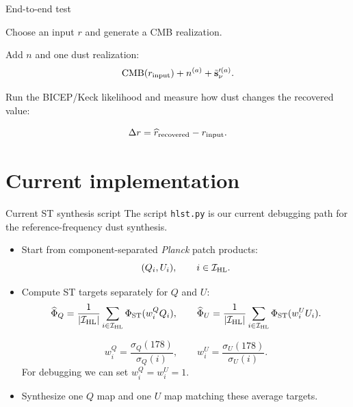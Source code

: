 \documentclass[aspectratio=169,11pt]{beamer}
\newcommand{\bk}{BICEP/Keck}
\newcommand{\Planck}{\textit{Planck}}
\newcommand{\st}{\mathrm{ST}}
\begin{document}
\begin{frame}{End-to-end test}
  \begin{center}
    \Large
    Choose an input $r$ and generate a CMB realization.

    \vspace{0.45cm}
    Add $n$ and one dust realization:
    \[
      {\rm CMB}(r_{\rm input}) + n^{(a)}
      + \tilde{\mathbf s}_{\nu}^{\prime(a)}.
    \]

    \vspace{0.45cm}
    Run the \bk{} likelihood and measure how dust changes the recovered value:

    \[
      \Delta r
      =
      \widehat r_{\rm recovered}
      -
      r_{\rm input}.
    \]
  \end{center}
\end{frame}

\section{Current implementation}

\begin{frame}{Current ST synthesis script}
  \small
  The script \texttt{hlst.py} is our current debugging path for the
  reference-frequency dust synthesis.

  \vspace{0.35cm}
  \begin{itemize}
    \item Start from component-separated \Planck{} patch products:
    \[
      (Q_i,U_i), \qquad i\in\mathcal I_{\rm HL}.
    \]

    \item Compute ST targets separately for $Q$ and $U$:
    \[
      \widehat\Phi_Q =
      \frac{1}{|\mathcal I_{\rm HL}|}
      \sum_{i\in\mathcal I_{\rm HL}}\Phi_{\st}(w_i^Q Q_i),
      \qquad
      \widehat\Phi_U =
      \frac{1}{|\mathcal I_{\rm HL}|}
      \sum_{i\in\mathcal I_{\rm HL}}\Phi_{\st}(w_i^U U_i).
    \]

    \[
      w_i^Q=\frac{\sigma_Q(178)}{\sigma_Q(i)},
      \qquad
      w_i^U=\frac{\sigma_U(178)}{\sigma_U(i)}.
    \]
    For debugging we can set $w_i^Q=w_i^U=1$.

    \item Synthesize one $Q$ map and one $U$ map matching these average targets.
  \end{itemize}
\end{frame}
\end{document}
